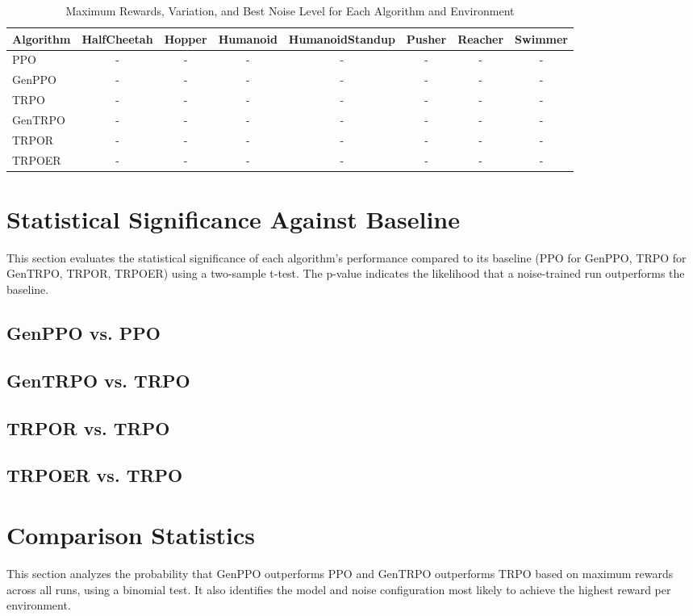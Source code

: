 \begin{table}[h]
\centering
\caption{Maximum Rewards, Variation, and Best Noise Level for Each Algorithm and Environment}
\label{tab:numerical_results}
\begin{tabular}{|l|c|c|c|c|c|c|c|}
\hline
Algorithm & HalfCheetah & Hopper & Humanoid & HumanoidStandup & Pusher & Reacher & Swimmer \\ \hline
PPO & - & - & - & - & - & - & - \\ \hline
GenPPO & - & - & - & - & - & - & - \\ \hline
TRPO & - & - & - & - & - & - & - \\ \hline
GenTRPO & - & - & - & - & - & - & - \\ \hline
TRPOR & - & - & - & - & - & - & - \\ \hline
TRPOER & - & - & - & - & - & - & - \\ \hline
\end{tabular}
\end{table}
\section{Statistical Significance Against Baseline}
This section evaluates the statistical significance of each algorithm’s performance compared to its baseline (PPO for GenPPO, TRPO for GenTRPO, TRPOR, TRPOER) using a two-sample t-test. The p-value indicates the likelihood that a noise-trained run outperforms the baseline.
\subsection{GenPPO vs. PPO}
\subsection{GenTRPO vs. TRPO}
\subsection{TRPOR vs. TRPO}
\subsection{TRPOER vs. TRPO}
\section{Comparison Statistics}
This section analyzes the probability that GenPPO outperforms PPO and GenTRPO outperforms TRPO based on maximum rewards across all runs, using a binomial test. It also identifies the model and noise configuration most likely to achieve the highest reward per environment.